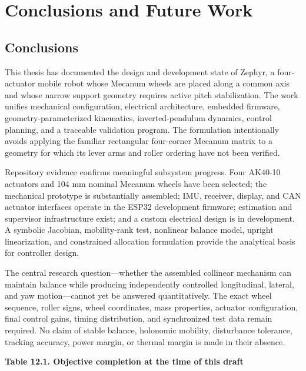 \chapter{Conclusions and Future Work}\label{ch:conclusions-and-future-work}

\section{Conclusions}\label{conclusions}

This thesis has documented the design and development state of Zephyr, a
four-actuator mobile robot whose Mecanum wheels are placed along a
common axis and whose narrow support geometry requires active pitch
stabilization. The work unifies mechanical configuration, electrical
architecture, embedded firmware, geometry-parameterized kinematics,
inverted-pendulum dynamics, control planning, and a traceable validation
program. The formulation intentionally avoids applying the familiar
rectangular four-corner Mecanum matrix to a geometry for which its lever
arms and roller ordering have not been verified.

Repository evidence confirms meaningful subsystem progress. Four AK40-10
actuators and 104 mm nominal Mecanum wheels have been selected; the
mechanical prototype is substantially assembled; IMU, receiver, display,
and CAN actuator interfaces operate in the ESP32 development firmware;
estimation and supervisor infrastructure exist; and a custom electrical
design is in development. A symbolic Jacobian, mobility-rank test,
nonlinear balance model, upright linearization, and constrained
allocation formulation provide the analytical basis for controller
design.

The central research question---whether the assembled collinear
mechanism can maintain balance while producing independently controlled
longitudinal, lateral, and yaw motion---cannot yet be answered
quantitatively. The exact wheel sequence, roller signs, wheel
coordinates, mass properties, actuator configuration, final control
gains, timing distribution, and synchronized test data remain required.
No claim of stable balance, holonomic mobility, disturbance tolerance,
tracking accuracy, power margin, or thermal margin is made in their
absence.

\par\medskip\noindent\singlespacing
{}
\textbf{Table 12.1. Objective completion at the time of this draft}\par

